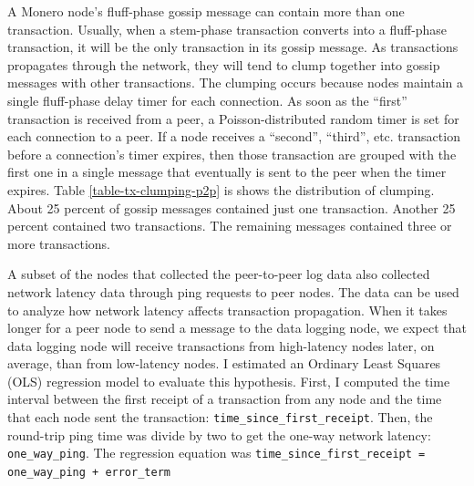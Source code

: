 \documentclass[usletter,11pt,english,openany]{article}
\begin{document}
A Monero node's fluff-phase gossip message can contain more than one
transaction. Usually, when a stem-phase transaction converts into
a fluff-phase transaction, it will be the only transaction in its
gossip message. As transactions propagates through the network, they
will tend to clump together into gossip messages with other transactions.
The clumping occurs because nodes maintain a single fluff-phase delay
timer for each connection. As soon as the ``first'' transaction
is received from a peer, a Poisson-distributed random timer is set
for each connection to a peer. If a node receives a ``second'',
``third'', etc. transaction before a connection's timer expires,
then those transaction are grouped with the first one in a single
message that eventually is sent to the peer when the timer expires.
Table \ref{table-tx-clumping-p2p} is shows the distribution of clumping.
About 25 percent of gossip messages contained just one transaction.
Another 25 percent contained two transactions. The remaining messages
contained three or more transactions.

\begin{table}%
\end{table}%

A subset of the nodes that collected the peer-to-peer log data also
collected network latency data through ping requests to peer nodes.
The data can be used to analyze how network latency affects transaction
propagation. When it takes longer for a peer node to send a message
to the data logging node, we expect that data logging node will receive
transactions from high-latency nodes later, on average, than from
low-latency nodes. I estimated an Ordinary Least Squares (OLS) regression
model to evaluate this hypothesis. First, I computed the time interval
between the first receipt of a transaction from any node and the time
that each node sent the transaction: \texttt{time\_since\_first\_receipt}.
Then, the round-trip ping time was divide by two to get the one-way
network latency: \texttt{one\_way\_ping}. The regression equation
was \texttt{time\_since\_first\_receipt = one\_way\_ping + error\_term}
\end{document}
